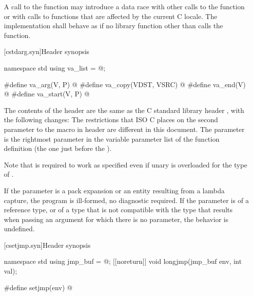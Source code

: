 \pnum
A call to the  function
may introduce a data race with other
calls to the  function or with calls to functions that are
affected by the current C locale. The implementation shall behave as if no
library function other than  calls the 
function.

[cstdarg.syn]{Header  synopsis}

%
%
%
%
%
%
\begin{codeblock}
namespace std {
  using va_list = @\seebelow@;
}

#define va_arg(V, P) @\seebelow@
#define va_copy(VDST, VSRC) @\seebelow@
#define va_end(V) @\seebelow@
#define va_start(V, P) @\seebelow@
\end{codeblock}

\pnum
The contents of the header  are the same as the C
standard library header , with the following changes:
The restrictions that ISO C places on the second parameter to the
%
 macro in header 
are different in this document.
The parameter
is the rightmost parameter in the variable parameter list
of the function definition (the one just before the
).
\begin{footnote}
Note that
is required to work as specified even if unary
is overloaded for the type of
.
\end{footnote}
If the parameter  is a pack expansion or
an entity resulting from a lambda capture,
the program is ill-formed, no diagnostic required.
If the parameter
is of a reference type, or of a type that is not compatible with the
type that results when passing an argument for which there is no
parameter, the behavior is undefined.


[csetjmp.syn]{Header  synopsis}

%
%
%
\begin{codeblock}
namespace std {
  using jmp_buf = @\seebelow@;
  [[noreturn]] void longjmp(jmp_buf env, int val);
}

#define setjmp(env) @\seebelow@
\end{codeblock}

